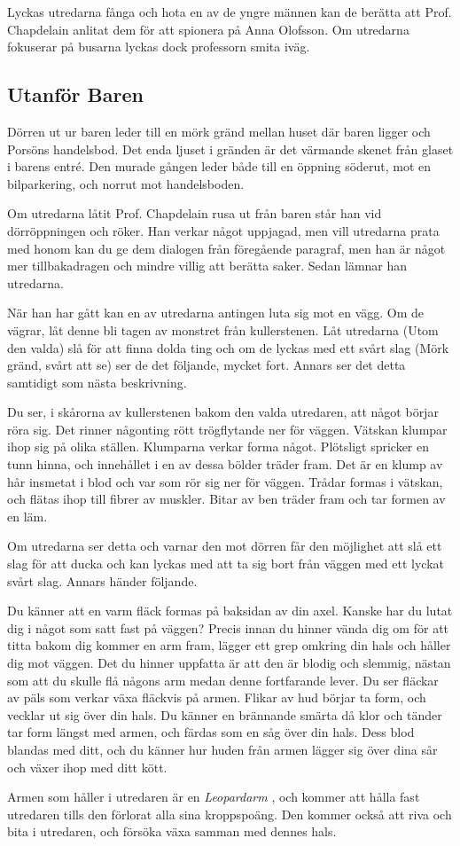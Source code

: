 Lyckas utredarna fånga och hota en av de yngre männen kan de berätta att Prof. Chapdelain anlitat dem för att spionera på Anna Olofsson. Om utredarna fokuserar på busarna lyckas dock professorn smita iväg.
%
\subsection{Utanför Baren}
\label{loc:UtanfarBaren}

\begin{displayquote}
	Dörren ut ur baren leder till en mörk gränd mellan huset där baren ligger och Porsöns handelsbod. Det enda ljuset i gränden är det värmande skenet från glaset i barens entré. Den murade gången leder både till en öppning söderut, mot en bilparkering, och norrut mot handelsboden.
\end{displayquote}
%
Om utredarna låtit Prof. Chapdelain rusa ut från baren står han vid dörröppningen och röker. Han verkar något uppjagad, men vill utredarna prata med honom kan du ge dem dialogen från föregående paragraf, men han är något mer tillbakadragen och mindre villig att berätta saker. Sedan lämnar han utredarna. 

När han har gått kan en av utredarna antingen luta sig mot en vägg. Om de vägrar, låt denne bli tagen av monstret från kullerstenen. Låt utredarna (Utom den valda) slå för att finna dolda ting och om de lyckas med ett svårt slag (Mörk gränd, svårt att se) ser de det följande, mycket fort. Annars ser det detta samtidigt som nästa beskrivning.

\begin{displayquote}
	Du ser, i skårorna av kullerstenen bakom den valda utredaren, att något börjar röra sig. Det rinner någonting rött trögflytande ner för väggen. Vätskan klumpar ihop sig på olika ställen. Klumparna verkar forma något. Plötsligt spricker en tunn hinna, och innehållet i en av dessa bölder träder fram. Det är en klump av hår insmetat i blod och var som rör sig ner för väggen. Trådar formas i vätskan, och flätas ihop till fibrer av muskler. Bitar av ben träder fram och tar formen av en läm.
\end{displayquote}
%
Om utredarna ser detta och varnar den mot dörren får den möjlighet att slå ett slag för att ducka och kan lyckas med att ta sig bort från väggen med ett lyckat svårt slag. Annars händer följande.

\begin{displayquote}
	Du känner att en varm fläck formas på baksidan av din axel. Kanske har du lutat dig i något som satt fast på väggen? Precis innan du hinner vända dig om för att titta bakom dig kommer en arm fram, lägger ett grep omkring din hals och håller dig mot väggen. Det du hinner uppfatta är att den är blodig och slemmig, nästan som att du skulle flå någons arm medan denne fortfarande lever. Du ser fläckar av päls som verkar växa fläckvis på armen. Flikar av hud börjar ta form, och vecklar ut sig över din hals. Du känner en brännande smärta då klor och tänder tar form längst med armen, och färdas som en såg över din hals. Dess blod blandas med ditt, och du känner hur huden från armen lägger sig över dina sår och växer ihop med ditt kött.
\end{displayquote}

Armen som håller i utredaren är en \textit{Leopardarm} \sectiondescribe{\ref{var:Leopardarm}}, och kommer att hålla fast utredaren tills den förlorat alla sina kroppspoäng. Den kommer också att riva och bita i utredaren, och försöka växa samman med dennes hals.
